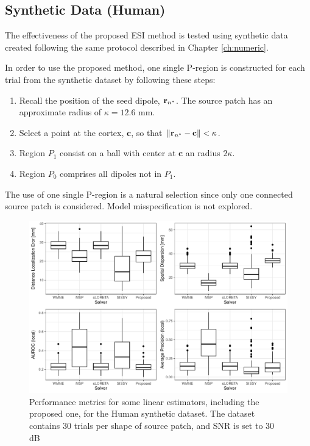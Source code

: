 \subsection{Synthetic Data (Human)}

The effectiveness of the proposed ESI method is tested using synthetic data created following the same protocol described in Chapter \ref{ch:numeric}.

In order to use the proposed method, one single P-region is constructed for each trial from the synthetic dataset by following these steps:
\begin{enumerate}
    \item Recall the position of the seed dipole, $\mathbf{r}_{n^*}$. The source patch has an approximate radius of $\kappa = 12.6$ mm.
    \item Select a point at the cortex, $\mathbf{c}$, so that $\left\lVert \mathbf{r}_{n^*}-\mathbf{c} \right\rVert< \kappa$.
    \item Region $P_1$ consist on a ball with center at $\mathbf{c}$ an radius $2\kappa$.
    \item Region $P_0$ comprises all dipoles not in $P_1$.
\end{enumerate}

The use of one single P-region is a natural selection since only one connected source patch is considered.
%
Model misspecification is not explored.

\begin{figure}
    \centering
    \includegraphics[width=0.9\linewidth]{img_stats/P_plot_EvalMetrics_Protocol04_30ALL.pdf}
    \caption{Performance metrics for some linear estimators, including the proposed one, for the Human synthetic dataset. The dataset contains 30 trials per shape of source patch, and SNR is set to 30 dB}
    \label{fig:results1_P}
\end{figure}

